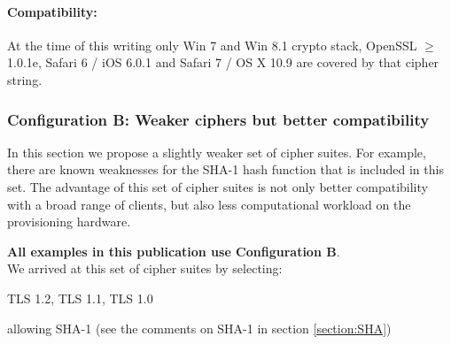 
\paragraph*{Compatibility:}

At the time of this writing only Win 7 and Win 8.1 crypto stack,
OpenSSL $\ge$ 1.0.1e, Safari 6 / iOS 6.0.1 and Safari 7 / OS X 10.9
are covered by that cipher string.


\subsubsection{Configuration B: Weaker ciphers but better compatibility}

In this section we propose a slightly weaker set of cipher suites.  For
example, there are known weaknesses for the SHA-1 hash function that is
included in this set.  The advantage of this set of cipher suites is not only
better compatibility with a broad range of clients, but also less computational
workload on the provisioning hardware.


\textbf{All examples in this publication use Configuration B}.\\

We arrived at this set of cipher suites by selecting:

\begin{itemize*}
  \item TLS 1.2, TLS 1.1, TLS 1.0
  \item allowing SHA-1 (see the comments on SHA-1 in section \ref{section:SHA})
\end{itemize*}

